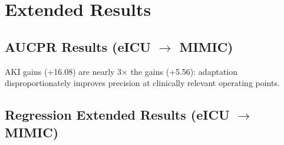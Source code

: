 \section{Extended Results}
\label{app:extended}

\subsection{AUCPR Results (eICU $\to$ MIMIC)}
\label{app:aucpr}

\begin{table}[h]
\centering
\caption{\aucpr{} results ($\times 100$) for classification tasks. Bootstrap 95\% CIs (500 replicates).}
\label{tab:aucpr}
\small
{}
\end{table}

AKI \aucpr{} gains (+16.08) are nearly 3$\times$ the \aucroc{} gains (+5.56): adaptation disproportionately improves precision at clinically relevant operating points.

\subsection{Regression Extended Results (eICU $\to$ MIMIC)}
\label{app:regression}

